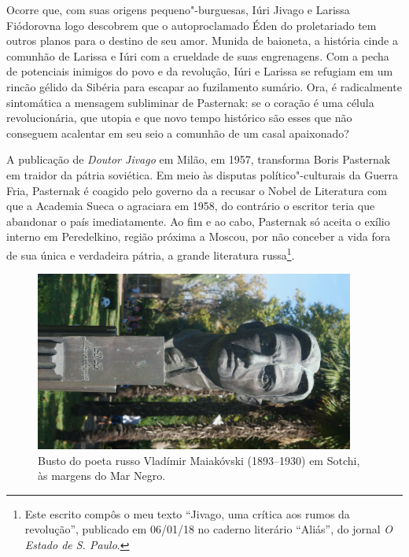 Ocorre que, com suas origens pequeno"-burguesas, Iúri Jivago e Larissa
Fiódorovna logo descobrem que o autoproclamado Éden do proletariado tem
outros planos para o destino de seu amor. Munida de baioneta, a história
cinde a comunhão de Larissa e Iúri com a crueldade de suas engrenagens.
Com a pecha de potenciais inimigos do povo e da revolução, Iúri e
Larissa se refugiam em um rincão gélido da Sibéria para escapar ao
fuzilamento sumário. Ora, é radicalmente sintomática a mensagem
subliminar de Pasternak: se o coração é uma célula revolucionária, que
utopia e que novo tempo histórico são esses que não conseguem acalentar
em seu seio a comunhão de um casal apaixonado?

A publicação de \emph{Doutor Jivago} em Milão, em 1957, transforma Boris
Pasternak em traidor da pátria soviética. Em meio às disputas
político"-culturais da Guerra Fria, Pasternak é coagido pelo governo da
 a recusar o Nobel de Literatura com que a Academia Sueca o
agraciara em 1958, do contrário o escritor teria que abandonar o país
imediatamente. Ao fim e ao cabo, Pasternak só aceita o exílio interno em
Peredelkino, região próxima a Moscou, por não conceber a vida fora de
sua única e verdadeira pátria, a grande literatura russa\footnote{Este
  escrito compôs o meu texto ``Jivago, uma crítica aos rumos da
  revolução'', publicado em 06/01/18 no caderno literário ``Aliás'', do
  jornal \emph{O Estado de S. Paulo}.}.

\pagebreak
\clearpage
\thispagestyle{empty}

\movetoevenpage
\begin{absolutelynopagebreak}
\begin{vplace}
\begin{figure}[H]
\begin{adjustwidth}{-2.7cm}{}
  \vspace{-2.8cm}
  \hspace{2.2cm}
  \includegraphics[width=105mm]{./imgs/sotchi1.jpg}  
\end{adjustwidth}
  \caption{Busto do poeta russo Vladímir Maiakóvski (1893--1930) em Sotchi, às margens do Mar Negro.}

\thispagestyle{empty}

\end{figure}
\end{vplace}

\end{absolutelynopagebreak}

